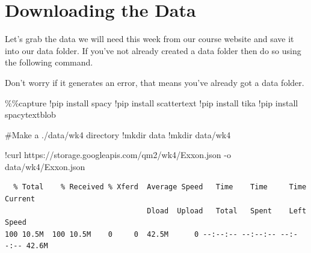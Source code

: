 \documentclass[
  letterpaper,
  DIV=11,
  numbers=noendperiod]{scrreprt}
\newenvironment{Shaded}{\begin{snugshade}}{\end{snugshade}}
\newcommand{\CommentTok}[1]{\textcolor[rgb]{0.37,0.37,0.37}{#1}}
\newcommand{\NormalTok}[1]{\textcolor[rgb]{0.00,0.23,0.31}{#1}}
\newcommand{\OperatorTok}[1]{\textcolor[rgb]{0.37,0.37,0.37}{#1}}
\begin{document}
\hypertarget{downloading-the-data-1}{%
\section{Downloading the Data}\label{downloading-the-data-1}}

Let's grab the data we will need this week from our course website and
save it into our data folder. If you've not already created a data
folder then do so using the following command.

Don't worry if it generates an error, that means you've already got a
data folder.

\begin{Shaded}
\begin{Highlighting}[]
\OperatorTok{\%\%}\NormalTok{capture}
\OperatorTok{!}\NormalTok{pip install spacy}
\OperatorTok{!}\NormalTok{pip install scattertext}
\OperatorTok{!}\NormalTok{pip install tika}
\OperatorTok{!}\NormalTok{pip install spacytextblob}
\end{Highlighting}
\end{Shaded}

\begin{Shaded}
\begin{Highlighting}[]
\CommentTok{\#Make a ./data/wk4 directory}
\OperatorTok{!}\NormalTok{mkdir data}
\OperatorTok{!}\NormalTok{mkdir data}\OperatorTok{/}\NormalTok{wk4}
\end{Highlighting}
\end{Shaded}

\begin{Shaded}
\begin{Highlighting}[]
\OperatorTok{!}\NormalTok{curl https:}\OperatorTok{//}\NormalTok{storage.googleapis.com}\OperatorTok{/}\NormalTok{qm2}\OperatorTok{/}\NormalTok{wk4}\OperatorTok{/}\NormalTok{Exxon.json }\OperatorTok{{-}}\NormalTok{o data}\OperatorTok{/}\NormalTok{wk4}\OperatorTok{/}\NormalTok{Exxon.json}
\end{Highlighting}
\end{Shaded}

\begin{verbatim}
  % Total    % Received % Xferd  Average Speed   Time    Time     Time  Current
                                 Dload  Upload   Total   Spent    Left  Speed
100 10.5M  100 10.5M    0     0  42.5M      0 --:--:-- --:--:-- --:--:-- 42.6M
\end{verbatim}
\end{document}
